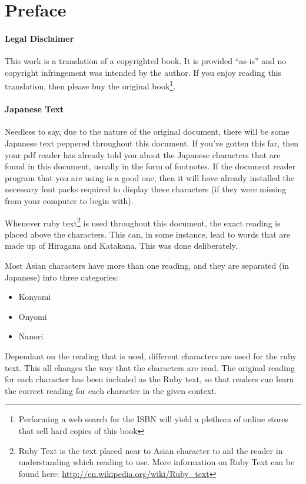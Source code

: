 \chapter*{Preface}
\subsubsection{Legal Disclaimer}
This work is a translation of a copyrighted book. It is provided ``as-is'' and no copyright infringement was intended by the author. If you enjoy reading this translation, then please buy the original book\footnote{Performing a web search for the ISBN will yield a plethora of online stores that sell hard copies of this book}.
\subsubsection{Japanese Text}
Needless to say, due to the nature of the original document, there will be some Japanese text peppered throughout this document. If you've gotten this far, then your pdf reader has already told you about the Japanese characters that are found in this document, usually in the form of footnotes. If the document reader program that you are using is a good one, then it will have already installed the necessary font packs required to display these characters (if they were missing from your computer to begin with).
\par Whenever ruby text\footnote{Ruby Text is the text placed near to Asian character to aid the reader in understanding which reading to use. More information on Ruby Text can be found here: \url{http://en.wikipedia.org/wiki/Ruby_text}} is used throughout this document, the exact reading is placed above the characters. This can, in some instance, lead to words that are made up of Hiragana and Katakana. This was done deliberately.
\par Most Asian characters have more than one reading, and they are separated (in Japanese) into three categories:
\begin{itemize}
\item Konyomi
\item Onyomi
\item Nanori
\end{itemize}
Dependant on the reading that is used, different characters are used for the ruby text. This all changes the way that the characters are read. The original reading for each character has been included as the Ruby text, so that readers can learn the correct reading for each character in the given context.
